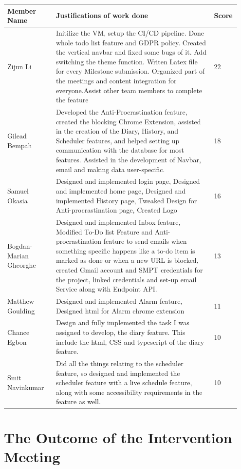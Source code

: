 \documentclass[a4paper]{article}
\begin{document}
{\noindent\begin{tabular}{|p{0.2\linewidth}|p{0.65\linewidth}|p{0.1\linewidth}|} 
	\hline
 \textbf{Member Name} & \textbf{Justifications of work done} & \textbf{Score}\\
 \hline
 Zijun Li & Initilize the VM, setup the CI/CD pipeline. Done whole todo list feature and GDPR policy. Created the vertical navbar and fixed some bugs of it. Add switching the theme function. Writen Latex file for every Milestone submission. Organized part of the meetings and content integration for everyone.Assist other team members to complete the feature & 22\\
 \hline
 Gilead Bempah & Developed the Anti-Procrastination feature, created the blocking Chrome Extension, assisted in the creation of the Diary, History, and Scheduler features, and helped setting up communication with the database for most features. Assisted in the development of Navbar, email and making data user-specific.& 18\\
 \hline
 Samuel Okasia & Designed and implemented login page, Designed and implemented home page, Designed and implemented History page, Tweaked Design for Anti-procrastination page, Created Logo & 16\\
 \hline
 Bogdan-Marian Gheorghe & Designed and implemented Inbox feature, Modified To-Do list Feature and Anti-procrastination feature to send emails when something specific happens like a to-do item is marked as done or when a new URL is blocked, created Gmail account and SMPT credentials for the project, linked credentials and set-up email Service along with Endpoint API. & 13\\
 \hline
 Matthew Goulding& Designed and implemented Alarm feature, Designed html for Alarm chrome extension & 11\\
 \hline
 Chance Egbon & Design and fully implemented the task I was assigned to develop, the diary feature.  This include the html, CSS and typescript of the diary feature.& 10\\
 \hline
 Smit Navinkumar& Did all the things relating to the scheduler feature, so designed and implemented the scheduler feature with a live schedule feature, along with some accessibility requirements in the feature as well.& 10\\
 \hline
\end{tabular}}

\newpage

\section*{The Outcome of the Intervention Meeting}
\end{document}
